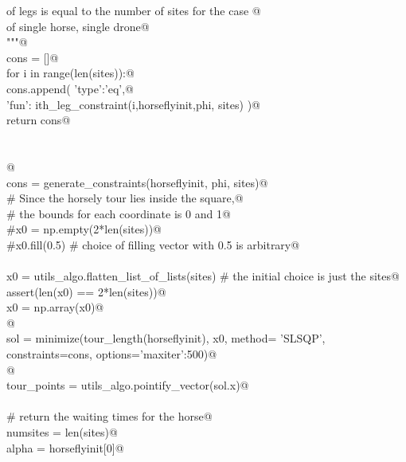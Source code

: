 \documentclass[11.5pt]{report}
\begin{document}
\begin{flushleft}
\begin{list}{}{}
\mbox{}\verb@        of legs is equal to the number of sites for the case @\\
\mbox{}\verb@        of single horse, single drone@\\
\mbox{}\verb@        """@\\
\mbox{}\verb@        cons = []@\\
\mbox{}\verb@        for i in range(len(sites)):@\\
\mbox{}\verb@            cons.append( { 'type':'eq',@\\
\mbox{}\verb@                            'fun': ith_leg_constraint(i,horseflyinit,phi, sites) } )@\\
\mbox{}\verb@        return cons@\\
\mbox{}\verb@@\\
\mbox{}\verb@@\\
\mbox{}\verb@    @\\
\mbox{}\verb@    cons = generate_constraints(horseflyinit, phi, sites)@\\
\mbox{}\verb@    # Since the horsely tour lies inside the square,@\\
\mbox{}\verb@    # the bounds for each coordinate is 0 and 1@\\
\mbox{}\verb@    #x0 = np.empty(2*len(sites))@\\
\mbox{}\verb@    #x0.fill(0.5) # choice of filling vector with 0.5 is arbitrary@\\
\mbox{}\verb@@\\
\mbox{}\verb@    x0 = utils_algo.flatten_list_of_lists(sites) # the initial choice is just the sites@\\
\mbox{}\verb@    assert(len(x0) == 2*len(sites))@\\
\mbox{}\verb@    x0 = np.array(x0)@\\
\mbox{}\verb@    @\\
\mbox{}\verb@    sol = minimize(tour_length(horseflyinit), x0, method= 'SLSQP', \@\\
\mbox{}\verb@                               constraints=cons, options={'maxiter':500})@\\
\mbox{}\verb@    @\\
\mbox{}\verb@    tour_points = utils_algo.pointify_vector(sol.x)@\\
\mbox{}\verb@@\\
\mbox{}\verb@    # return the waiting times for the horse@\\
\mbox{}\verb@    numsites            = len(sites)@\\
\mbox{}\verb@    alpha               = horseflyinit[0]@\\

\end{list}
\end{flushleft}
\end{document}
